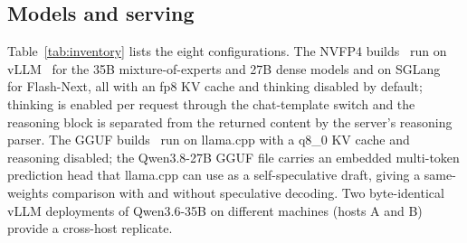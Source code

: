 \documentclass[11pt]{article}
\begin{document}
\subsection{Models and serving}
\label{sec:models}

Table~\ref{tab:inventory} lists the eight configurations. The NVFP4
builds~\citep{nvidia2025nvfp4,nvidia2026qwen36nvfp4} run on
vLLM~\citep{kwon2023vllm} for the 35B mixture-of-experts and 27B dense
models and on SGLang~\citep{zheng2024sglang} for Flash-Next, all with an
fp8 KV cache and thinking disabled by default; thinking is enabled per
request through the chat-template switch and the reasoning block is
separated from the returned content by the server's reasoning parser. The
GGUF builds~\citep{gerganov_llamacpp,unsloth2026qwen36gguf,
unsloth2026qwen38gguf} run on llama.cpp with a q8\_0 KV cache and reasoning
disabled; the Qwen3.8-27B GGUF file carries an embedded multi-token
prediction head that llama.cpp can use as a self-speculative draft, giving a
same-weights comparison with and without speculative decoding. Two
byte-identical vLLM deployments of Qwen3.6-35B on different machines (hosts
A and B) provide a cross-host replicate.

\begin{table}[htbp]
\centering
\caption{Model inventory. All Qwen builds are the instruct checkpoints
  \citep{qwen2026qwen36_35b,qwen2026qwen36_27b,qwen2026qwen38_27b,
  qwen2026qwen38flashnext}. GGUF tier is Unsloth UD-Q4\_K\_XL. Hardware is
  given in Appendix~\ref{app:compute}.}
\label{tab:inventory}
\small
{}
\end{table}
\end{document}
